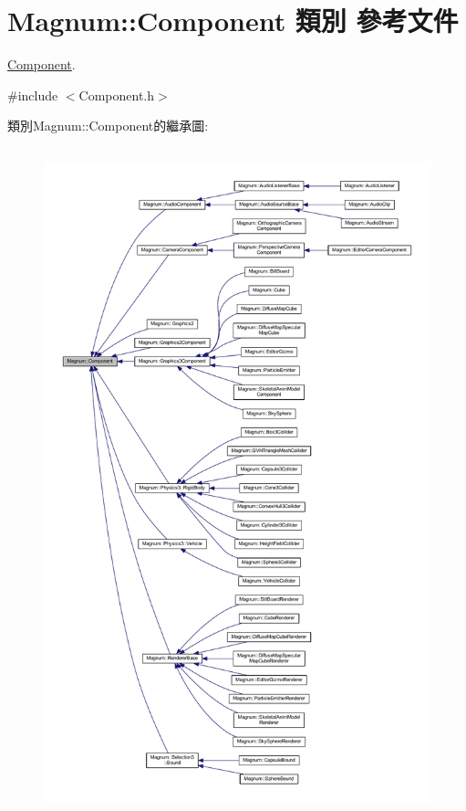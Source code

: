 \hypertarget{class_magnum_1_1_component}{}\section{Magnum\+:\+:Component 類別 參考文件}
\label{class_magnum_1_1_component}


\hyperlink{class_magnum_1_1_component}{Component}.  




{\ttfamily \#include $<$Component.\+h$>$}



類別\+Magnum\+:\+:Component的繼承圖\+:\nopagebreak
\begin{figure}[H]
\begin{center}
\leavevmode
\includegraphics[height=550pt]{class_magnum_1_1_component__inherit__graph}
\end{center}
\end{figure}
